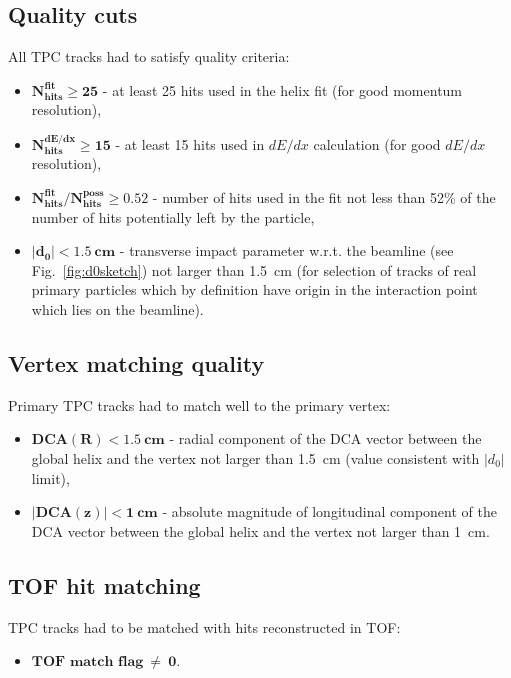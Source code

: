 \subsection{Quality cuts}\label{sec:TpcQualityCuts}
All TPC tracks had to satisfy quality criteria:
\begin{itemize}
\item \textbf{$\bm{N_{\textrm{hits}}^{\textrm{fit}}\geq25}$} - at least 25 hits used in the helix fit (for good momentum resolution),
\item \textbf{$\bm{N_{\textrm{hits}}^{\textrm{dE/dx}}\geq15}$} - at least 15 hits used in $dE/dx$ calculation (for good $dE/dx$ resolution),
\item \textbf{$\bm{N_{\textrm{hits}}^{\textrm{fit}}/N_{\textrm{hits}}^{\textrm{poss}}\geq0.52}$} - number of hits used in the fit not less than 52\% of the number of hits potentially left by the particle,
\item \textbf{$\bm{|d_{0}|<1.5~\text{cm}}$} - transverse impact parameter w.r.t. the beamline (see Fig.~\ref{fig:d0sketch}) not larger than 1.5~cm (for selection of tracks of real primary particles which by definition have origin in the interaction point which lies on the beamline).
\end{itemize}
\subsection{Vertex matching quality}\label{sec:TpcDcaCuts}
Primary TPC tracks had to match well to the primary vertex:
\begin{itemize}
 \item \textbf{$\bm{\textrm{DCA}(R)<1.5~\text{cm}}$} - radial component of the DCA vector between the global helix and the vertex not larger than 1.5~cm (value consistent with $|d_{0}|$ limit),
 \item \textbf{$\bm{|\textrm{DCA}(z)|<1~\text{cm}}$} - absolute magnitude of longitudinal component of the DCA vector between the global helix and the vertex not larger than 1~cm.
 \end{itemize}
\subsection{TOF hit matching}\label{sec:TpcTofMatchingRequirement}
TPC tracks had to be matched with hits reconstructed in TOF:
\begin{itemize}
 \item \textbf{$\bm{\text{TOF match flag}~\neq~0}$}.
\end{itemize}

